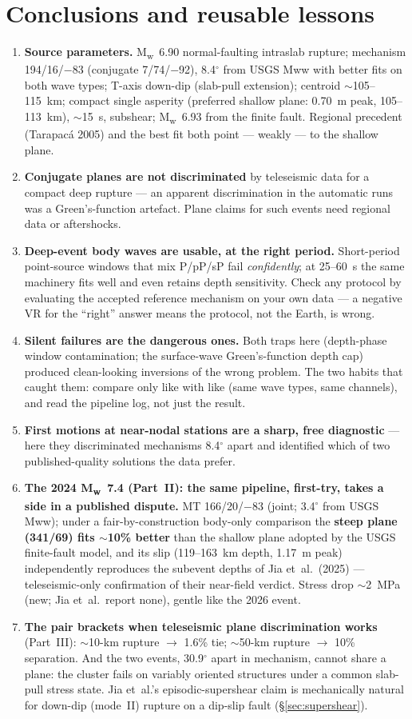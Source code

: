 \documentclass[11pt]{article}
\newcommand{\Mw}{M\textsubscript{w}}
\begin{document}
\section{Conclusions and reusable lessons}
\begin{enumerate}
\item \textbf{Source parameters.} \Mw~6.90 normal-faulting intraslab rupture; mechanism
194/16/$-$83 (conjugate 7/74/$-$92), 8.4$^\circ$ from USGS Mww with better fits on both wave
types; T-axis down-dip (slab-pull extension); centroid $\sim$105--115~km; compact single
asperity (preferred shallow plane: 0.70~m peak, 105--113~km), $\sim$15~s, subshear;
\Mw~6.93 from the finite fault. Regional precedent (Tarapac\'a 2005) and the best fit both
point --- weakly --- to the shallow plane.
\item \textbf{Conjugate planes are not discriminated} by teleseismic data for a compact deep
rupture --- an apparent discrimination in the automatic runs was a Green's-function artefact.
Plane claims for such events need regional data or aftershocks.
\item \textbf{Deep-event body waves are usable, at the right period.} Short-period
point-source windows that mix P/pP/sP fail \emph{confidently}; at 25--60~s the same machinery
fits well and even retains depth sensitivity. Check any protocol by evaluating the accepted
reference mechanism on your own data --- a negative VR for the ``right'' answer means the
protocol, not the Earth, is wrong.
\item \textbf{Silent failures are the dangerous ones.} Both traps here (depth-phase window
contamination; the surface-wave Green's-function depth cap) produced clean-looking inversions
of the wrong problem. The two habits that caught them: compare only like with like (same wave
types, same channels), and read the pipeline log, not just the result.
\item \textbf{First motions at near-nodal stations are a sharp, free diagnostic} --- here they
discriminated mechanisms 8.4$^\circ$ apart and identified which of two published-quality
solutions the data prefer.
\item \textbf{The 2024 \Mw~7.4 (Part~II): the same pipeline, first-try, takes a side in a
published dispute.} MT 166/20/$-$83 (joint; 3.4$^\circ$ from USGS Mww); under a
fair-by-construction body-only comparison the \textbf{steep plane (341/69) fits $\sim$10\%
better} than the shallow plane adopted by the USGS finite-fault model, and its slip
(119--163~km depth, 1.17~m peak) independently reproduces the subevent depths of Jia
et~al.\ (2025) --- teleseismic-only confirmation of their near-field verdict. Stress drop
$\sim$2~MPa (new; Jia et~al.\ report none), gentle like the 2026 event.
\item \textbf{The pair brackets when teleseismic plane discrimination works} (Part~III):
$\sim$10-km rupture $\to$ 1.6\% tie; $\sim$50-km rupture $\to$ 10\% separation. And the two
events, 30.9$^\circ$ apart in mechanism, cannot share a plane: the cluster fails on variably
oriented structures under a common slab-pull stress state. Jia et~al.'s episodic-supershear
claim is mechanically natural for down-dip (mode~II) rupture on a dip-slip fault
(\S\ref{sec:supershear}).
\end{enumerate}
\end{document}
